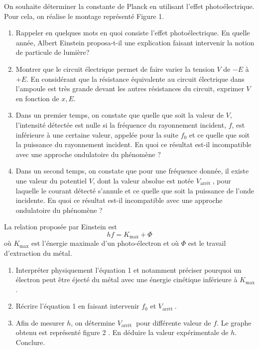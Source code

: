 On souhaite déterminer la constante de Planck en utilisant l'effet photoélectrique. Pour cela, on réalise le montage représenté Figure 1.

\begin{enumerate}
\item Rappeler en quelques mots en quoi consiste l'effet photoélectrique. En quelle année, Albert Einstein proposa-t-il une explication faisant intervenir la notion de particule de lumière?
\item Montrer que le circuit électrique permet de faire varier la tension $V$ de $-E$ à $+E$. En considérant que la résistance équivalente au circuit électrique dans l'ampoule est très grande devant les autres résistances du circuit, exprimer $V$ en fonction de $x, E$.
\item Dans un premier temps, on constate que quelle que soit la valeur de $V$, l'intensité détectée est nulle si la fréquence du rayonnement incident, $f$, est inférieure à une certaine valeur, appelée pour la suite $f_0$ et ce quelle que soit la puissance du rayonnement incident. En quoi ce résultat est-il incompatible avec une approche ondulatoire du phénomène ?
\item  Dans un second temps, on constate que pour une fréquence donnée, il existe une valeur du potentiel $V$, dont la valeur absolue est notée $V_{\text {arrêt }}$, pour laquelle le courant détecté s'annule et ce quelle que soit la puissance de l'onde incidente. En quoi ce résultat est-il incompatible avec une approche ondulatoire du phénomène ?
\end{enumerate}
La relation proposée par Einstein est
$$
h f=K_{\max }+\Phi
$$
où $K_{\max }$ est l'énergie maximale d'un photo-électron et où $\Phi$ est le travail d'extraction du métal.

\begin{enumerate}[resume]
\item Interpréter physiquement l'équation 1 et notamment préciser pourquoi un électron peut être éjecté du métal avec une énergie cinétique inférieure à $K_{\max }$.
\item Récrire l'équation 1 en faisant intervenir $f_0$ et $V_{\text {arrêt }}$.
\item Afin de mesurer $h$, on détermine $V_{\text {arrêt }}$ pour différente valeur de $f$. Le graphe obtenu est représenté figure 2 . En déduire la valeur expérimentale de $h$. Conclure.
\end{enumerate}

\begin{center}
\end{center}


